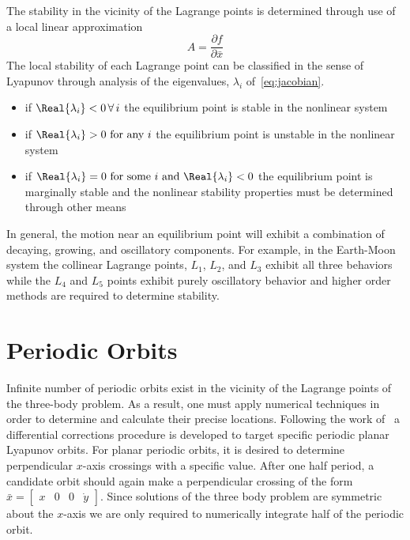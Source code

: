 The stability in the vicinity of the Lagrange points is determined through use of a local linear approximation 
\begin{equation}
	A = \frac{\partial f}{\partial \bar{x}}
	\label{eq:jacobian}
\end{equation}
The local stability of each Lagrange point can be classified in the sense of Lyapunov through analysis of the eigenvalues, \( \lambda_i \) of~\eqref{eq:jacobian}.
\begin{itemize}
	\item if \(\Real{\lambda_i} < 0 \, \forall \, i\) the equilibrium point is stable in the nonlinear system
	\item if \(\Real{\lambda_i} > 0  \text{ for any } i\) the equilibrium point is unstable in the nonlinear system
	\item if \(\Real{\lambda_i} = 0 \text{ for some } i \text { and } \Real{\lambda_i} < 0 \) the equilibrium point is marginally stable and the nonlinear stability properties must be determined through other means
\end{itemize}
In general, the motion near an equilibrium point will exhibit a combination of decaying, growing, and oscillatory components. 
For example, in the Earth-Moon system the collinear Lagrange points, \(L_1\), \(L_2\), and \( L_3\) exhibit all three behaviors while the \(L_4\) and \(L_5\) points exhibit purely oscillatory behavior and higher order methods are required to determine stability.
\section{Periodic Orbits}\label{sec:dst}
Infinite number of periodic orbits exist in the vicinity of the Lagrange points of the three-body problem.
As a result, one must apply numerical techniques in order to determine and calculate their precise locations.
Following the work of~\cite{howell1994,connor-howell1984a} a differential corrections procedure is developed to target specific periodic planar Lyapunov orbits.
For planar periodic orbits, it is desired to determine perpendicular \(x\)-axis crossings with a specific value.
After one half period, a candidate orbit should again make a perpendicular crossing of the form \( \bar{x} = \left[\begin{array}{cccc} x & 0 & 0 & \dot{y} \end{array}\right]\).
Since solutions of the three body problem are symmetric about the \(x\)-axis we are only required to numerically integrate half of the periodic orbit.

